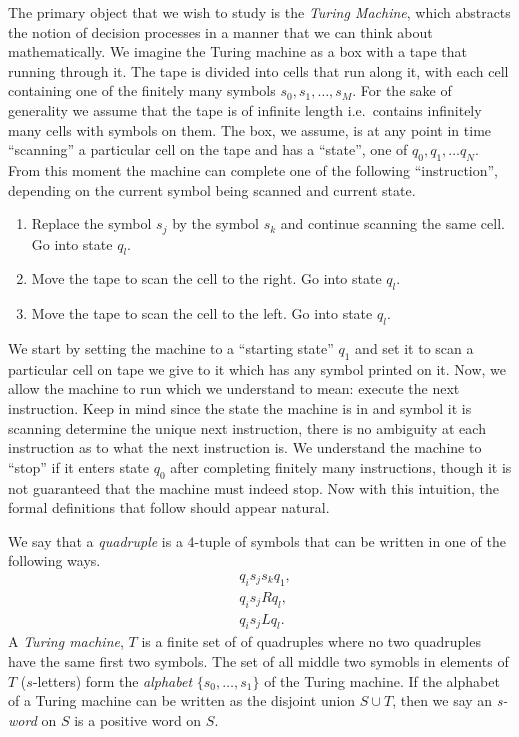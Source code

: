 The primary object that we wish to study is the \emph{Turing Machine}, which abstracts the notion of decision processes in a manner that we can think about mathematically. We imagine the Turing machine as a box with a tape that running through it. The tape is divided into cells that run along it, with each cell containing one of the finitely many symbols $s_0,s_1,\dots,s_M$. For the sake of generality we assume that the tape is of infinite length i.e.\ contains infinitely many cells with symbols on them. The box, we assume, is at any point in time ``scanning'' a particular cell on the tape and has a ``state'', one of $q_0,q_1,\dots q_N$. From this moment the machine can complete one of the following ``instruction'', depending on the current symbol being scanned and current state.
\begin{enumerate}
\item Replace the symbol $s_j$ by the symbol $s_k$ and continue scanning the same cell. Go into state $q_l$.
\item Move the tape to scan the cell to the right. Go into state $q_l$.
\item Move the tape to scan the cell to the left. Go into state $q_l$.
\end{enumerate}
We start by setting the machine to a ``starting state'' $q_1$ and set it to  scan a particular cell on tape we give to it which has any symbol printed on it. Now, we allow the machine to run which we understand to mean: execute the next instruction. Keep in mind since the state the machine is in and symbol it is scanning determine the unique next instruction, there is no ambiguity at each instruction as to what the next instruction is. We understand the machine to ``stop'' if it enters state $q_0$ after completing finitely many instructions, though it is not guaranteed that the machine must indeed stop. Now with this intuition, the formal definitions that follow should appear natural.

\begin{definition}
  We say that a \emph{quadruple} is a $4$-tuple of symbols that can be written in one of the following ways.
  \begin{align*}
    & q_is_js_kq_1, \\
    & q_is_jRq_l, \\
    & q_is_jLq_l.
  \end{align*}
  A \emph{Turing machine}, $T$ is a finite set of of quadruples where no two quadruples have the same first two symbols. The set of all middle two symobls in elements of $T$ ($s$-letters) form the \emph{alphabet} $\{s_0, \dots, s_1\}$ of the Turing machine. If the alphabet of a Turing machine can be written as the disjoint union $S \cup T$, then we say an \emph{s-word} on $S$ is a positive word on $S$.
\end{definition}

